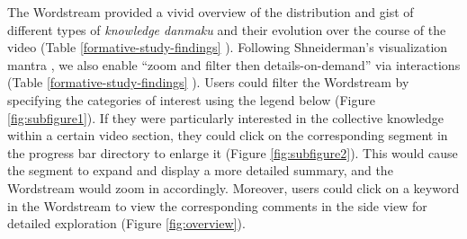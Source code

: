 The Wordstream provided a vivid overview of the distribution and gist of different types of \textit{knowledge danmaku} and their evolution over the course of the video (Table \ref{formative-study-findings} ). 
Following Shneiderman's visualization mantra \cite{shneiderman2003eyes}, we also enable ``zoom and filter then details-on-demand'' via interactions (Table \ref{formative-study-findings} ). 
Users could filter the Wordstream by specifying the categories of interest using the legend below (Figure \ref{fig:subfigure1}). If they were particularly interested in the collective knowledge within a certain video section, they could click on the corresponding segment in the progress bar directory to enlarge it (Figure \ref{fig:subfigure2}). This would cause the segment to expand and display a more detailed summary, and the Wordstream would zoom in accordingly. 
Moreover, users could click on a keyword in the Wordstream to view the corresponding comments in the side view for detailed exploration (Figure \ref{fig:overview}).


